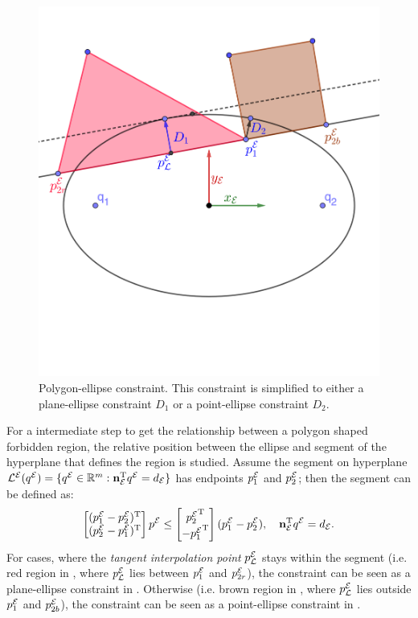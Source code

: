 \documentclass[journal]{IEEEtran}  %
\begin{document}
\begin{figure}[htbp]
\begin{center}
\includegraphics[width=0.6\linewidth,trim = 0cm 1cm 0.3cm 0.5cm, clip]{Ellipse2safezone_V2}
\caption{Polygon-ellipse constraint. This constraint is simplified to either a plane-ellipse constraint $D_{1}$ or a point-ellipse constraint $D_{2}$.}
\label{fig:Ellipse-to-safezone}
\end{center}
\end{figure}

For a intermediate step to get the relationship between a polygon shaped forbidden region, the relative position between the ellipse and segment of the hyperplane that defines the region is studied. 
Assume the segment on hyperplane ${\mathcal{L}^{\mathcal{E}}}({q^{\mathcal{E}}}) = \{ {q^{\mathcal{E}}}\in\mathbb{R}^m:  \mathbf{n}_{\mathcal{E}}^\mathrm{T} {q^{\mathcal{E}}} = d_{\mathcal{E}}\}$ has endpoints ${p_1^{\mathcal{E}}}$ and ${p_2^{\mathcal{E}}}$; then the segment can be defined as:
\begin{equation}
\begin{bmatrix}({p_1^{\mathcal{E}}}- {p_2^{\mathcal{E}}})^\mathrm{T}\\( {p_2^{\mathcal{E}}} - {p_1^{\mathcal{E}}})^\mathrm{T}\end{bmatrix}  {p^{\mathcal{E}}} \leq \begin{bmatrix} {p_2^{\mathcal{E}}}^\mathrm{T}\\- {p_1^{\mathcal{E}}}^\mathrm{T}\end{bmatrix}( {p_1^{\mathcal{E}}}- {p_2^{\mathcal{E}}}), \quad \mathbf{n}_{\mathcal{E}}^\mathrm{T} {q^{\mathcal{E}}} = d_{\mathcal{E}}.
\end{equation}
For cases, where the \emph{tangent interpolation point} ${p_{\mathcal{L}}^{\mathcal{E}}}$ stays within the segment (i.e. red region in , where ${p_{\mathcal{L}}^{\mathcal{E}}}$ lies between ${p_{1}^{\mathcal{E}}}$ and ${p_{2r}^{\mathcal{E}}}$), the constraint can be seen as a plane-ellipse constraint in . Otherwise (i.e. brown region in , where ${p_{\mathcal{L}}^{\mathcal{E}}}$ lies outside ${p_{1}^{\mathcal{E}}}$ and ${p_{2b}^{\mathcal{E}}}$), the constraint can be seen as a point-ellipse constraint in .
\end{document}
